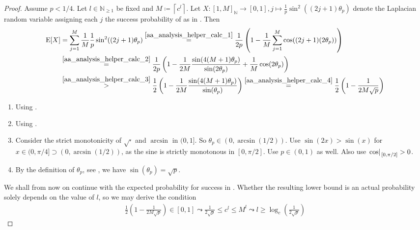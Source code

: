 \begin{proof}
    Assume \(p < 1/4\). Let \(l \in \mathbb{N}_{\geq 1}\) be fixed and \(M \coloneqq \left\lceil c^l \right\rceil\). Let \(X\colon [1, M]_{\mathbb{N}} \to [0, 1], j \mapsto \frac{1}{p}\sin^2((2j+1)\theta_p)\) denote the Laplacian random variable assigning each \(j\) the success probability of  as in . Then
    \begin{align}
        \operatorname{E}[X] &= \sum_{j=1}^M \frac{1}{M} \frac{1}{p} \sin^2((2j+1)\theta_p) \overset{\ref{aa_analysis_helper_calc_1}}{=} \frac{1}{2p} \left(1-\frac{1}{M}\sum_{j=1}^M \cos((2j+1)(2\theta_p))\right)\\
        &\overset{\ref{aa_analysis_helper_calc_2}}{=} \frac{1}{2p}\left(1 - \frac{1}{2M}\frac{\sin(4(M+1)\theta_p)}{\sin(2\theta_p)} + \frac{1}{M} \cos(2\theta_p)\right)\\
        &\overset{\ref{aa_analysis_helper_calc_3}}{>} \frac{1}{2}\left(1-\frac{1}{2M}\frac{\sin(4(M+1)\theta_p)}{\sin(\theta_p)}\right) \overset{\ref{aa_analysis_helper_calc_4}}{=} \frac{1}{2}\left(1-\frac{1}{2M\sqrt{p}}\right)
    \end{align}
    \begin{enumerate}[label=(\arabic*)]
        \item Using . \label{aa_analysis_helper_calc_1}
        \item Using . \label{aa_analysis_helper_calc_2}
        \item Consider the strict monotonicity of \(\sqrt{\cdot}\) and \(\arcsin\) in \((0, 1]\). So \(\theta_p \in (0, \arcsin(1/2))\). Use \(\sin(2x) > \sin(x)\) for \(x \in (0, \pi / 4] \supset (0, \arcsin(1/2))\), as the sine is strictly monotonous in \([0, \pi/2]\). Use \(p \in (0, 1)\) as well. Also use \(\left.{\cos}\middle|\right._{[0, \pi/2]} > 0\). \label{aa_analysis_helper_calc_3}
        \item By the definition of \(\theta_p\), see , we have \(\sin(\theta_p) = \sqrt{p}\). \label{aa_analysis_helper_calc_4}
    \end{enumerate}
    We shall from now on continue with the expected probability for success in . Whether the resulting lower bound is an actual probability solely depends on the value of \(l\), so we may derive the condition
    \begin{align}
        \frac{1}{2}\left(1-\frac{1}{2M\sqrt{p}}\right) \in [0, 1] \leadsto \frac{1}{2\sqrt{p}} \leq c^l \leq M^l \leadsto l \geq \log_c\left(\frac{1}{2\sqrt{p}}\right) \label{aa_lower_bound_becomes_probability}

\end{align}
\end{proof}
